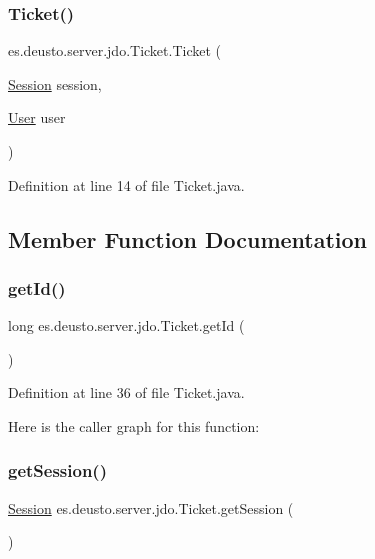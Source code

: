 \subsubsection{\texorpdfstring{Ticket()}{Ticket()}}
{\footnotesize\ttfamily es.\+deusto.\+server.\+jdo.\+Ticket.\+Ticket (\begin{DoxyParamCaption}\item[{\mbox{\hyperlink{classes_1_1deusto_1_1server_1_1jdo_1_1_session}{Session}}}]{session,  }\item[{\mbox{\hyperlink{classes_1_1deusto_1_1server_1_1jdo_1_1_user}{User}}}]{user }\end{DoxyParamCaption})}



Definition at line 14 of file Ticket.\+java.



\subsection{Member Function Documentation}
\mbox{\label{classes_1_1deusto_1_1server_1_1jdo_1_1_ticket_a9dadf081db69123f90cfe2cb9f7c0870}} 
\subsubsection{\texorpdfstring{getId()}{getId()}}
{\footnotesize\ttfamily long es.\+deusto.\+server.\+jdo.\+Ticket.\+get\+Id (\begin{DoxyParamCaption}{ }\end{DoxyParamCaption})}



Definition at line 36 of file Ticket.\+java.

Here is the caller graph for this function\+:
\mbox{\label{classes_1_1deusto_1_1server_1_1jdo_1_1_ticket_a60d6aebd66fee1d5d0ebde52540dcac9}} 
\subsubsection{\texorpdfstring{getSession()}{getSession()}}
{\footnotesize\ttfamily \mbox{\hyperlink{classes_1_1deusto_1_1server_1_1jdo_1_1_session}{Session}} es.\+deusto.\+server.\+jdo.\+Ticket.\+get\+Session (\begin{DoxyParamCaption}{ }\end{DoxyParamCaption})}



